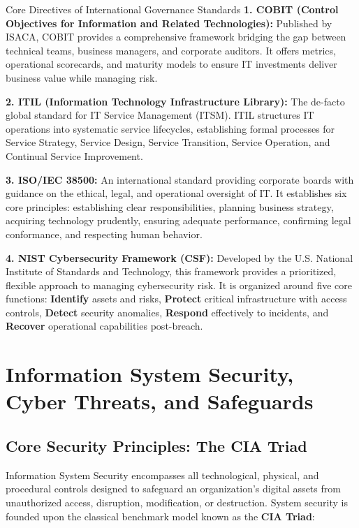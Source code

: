 \documentclass[11pt,a4paper]{article}
\begin{document}
\begin{governancebox}{Core Directives of International Governance Standards}
\textbf{1. COBIT (Control Objectives for Information and Related Technologies):} Published by ISACA, COBIT provides a comprehensive framework bridging the gap between technical teams, business managers, and corporate auditors. It offers metrics, operational scorecards, and maturity models to ensure IT investments deliver business value while managing risk.

\textbf{2. ITIL (Information Technology Infrastructure Library):} The de-facto global standard for IT Service Management (ITSM). ITIL structures IT operations into systematic service lifecycles, establishing formal processes for Service Strategy, Service Design, Service Transition, Service Operation, and Continual Service Improvement.

\textbf{3. ISO/IEC 38500:} An international standard providing corporate boards with guidance on the ethical, legal, and operational oversight of IT. It establishes six core principles: establishing clear responsibilities, planning business strategy, acquiring technology prudently, ensuring adequate performance, confirming legal conformance, and respecting human behavior.

\textbf{4. NIST Cybersecurity Framework (CSF):} Developed by the U.S. National Institute of Standards and Technology, this framework provides a prioritized, flexible approach to managing cybersecurity risk. It is organized around five core functions: \textbf{Identify} assets and risks, \textbf{Protect} critical infrastructure with access controls, \textbf{Detect} security anomalies, \textbf{Respond} effectively to incidents, and \textbf{Recover} operational capabilities post-breach.
\end{governancebox}

\section{Information System Security, Cyber Threats, and Safeguards}
\label{sec:security}

\subsection{Core Security Principles: The CIA Triad}
Information System Security encompasses all technological, physical, and procedural controls designed to safeguard an organization's digital assets from unauthorized access, disruption, modification, or destruction. System security is founded upon the classical benchmark model known as the \textbf{CIA Triad}:
\end{document}
